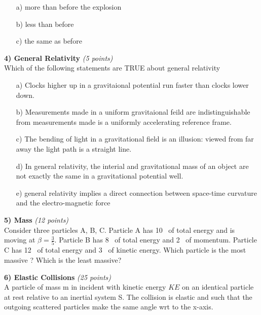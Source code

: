 {\begin{itemize}
\item[a)] more than before the explosion
\item[b)] less than before
\item[c)] the same as before
\end{itemize}


\clearpage

\textbf{4) General Relativity }\hfill \textit{(5 points)}\\
Which of the following statements are TRUE about general relativity
\begin{itemize}
\item[a)] Clocks higher up in a gravitaional potential run faster than clocks lower down.
\item[b)] Measurements made in a uniform gravitaional feild are indistinguishable from measurements made is a uniformly accelerating reference frame.
\item[c)] The bending of light in a gravitational field is an illusion: viewed from far away the light path is a straight line.
\item[d)] In general relativity, the interial and gravitational mass of an object are not exactly the same in a gravitational potential well.
\item[e)] general relativity implies a direct connection between space-time curvature and the electro-magnetic force
\end{itemize}

\vspace{0.5in}

\textbf{5) Mass }\hfill \textit{(12 points)}\\

Consider three particles A, B, C.
Particle A has 10 \GeV\ of total energy and is moving at $\beta = \frac{3}{5}$.
Particle B has 8 \GeV\ of total energy and 2 \GeV\ of momentum.
Particle C has 12 \GeV\ of total energy and 3 \GeV\ of kinetic energy.
Which particle is the most massive ?
Which is the least massive?


\vspace{0.1in}

\clearpage

\textbf{6) Elastic Collisions }\hfill \textit{(25 points)}\\
A particle of mass m in incident with kinetic energy $KE$ on an identical particle at rest relative to an inertial system S.
The collision is elastic and such that the outgoing scattered particles make the same angle wrt to the x-axis.  


}
